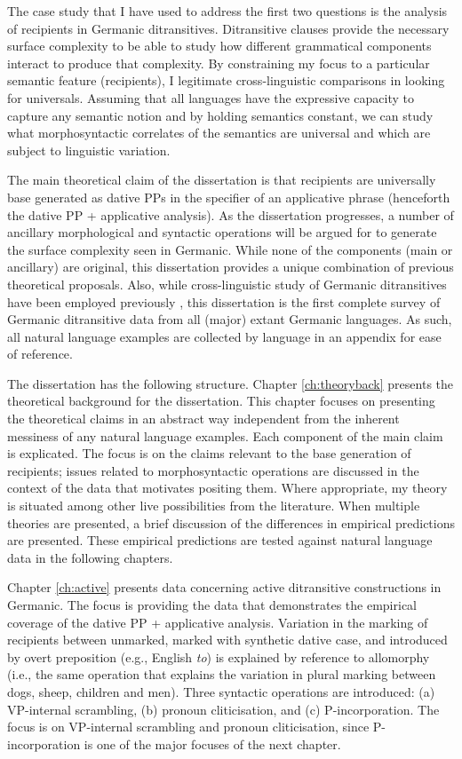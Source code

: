 The case study that I have used to address the first two questions is the analysis of recipients in Germanic ditransitives. Ditransitive clauses provide the necessary surface complexity to be able to study how different grammatical components interact to produce that complexity. By constraining my focus to a particular semantic feature (recipients), I legitimate cross-linguistic comparisons in looking for universals. Assuming that all languages have the expressive capacity to capture any semantic notion and by  holding semantics constant, we can study  what morphosyntactic correlates of the semantics are universal and which are subject to linguistic variation.

The main theoretical claim of the dissertation is that recipients are universally base generated as dative PPs in the specifier of an applicative phrase (henceforth the dative PP + applicative analysis). As the dissertation progresses, a number of ancillary morphological and syntactic operations will be argued for to generate the surface complexity seen in Germanic. While none of the components (main or ancillary) are original, this dissertation provides a unique combination of previous theoretical proposals. Also, while cross-linguistic study of Germanic ditransitives have been employed previously \citep[among others]{Falk.1990,Sprouse.1995,Holmberg.1995}, this dissertation is the first complete survey of Germanic ditransitive data from all (major) extant Germanic languages. As such, all natural language examples are collected by language in an appendix for ease of reference.

The dissertation has the following structure. Chapter \ref{ch:theoryback} presents the theoretical background for the dissertation. This chapter focuses on presenting the theoretical claims in an abstract way independent from the inherent messiness of any natural language examples. Each component of the main claim is explicated. The focus is on the claims relevant to the base generation of recipients; issues related to morphosyntactic operations are discussed in the context of the data that motivates positing them. Where appropriate, my theory is situated among other live possibilities from the literature. When multiple theories are presented, a brief discussion of the differences in empirical predictions are presented. These empirical predictions are tested against natural language data in the following chapters.

Chapter \ref{ch:active} presents data concerning active ditransitive constructions in Germanic. The focus is providing the data that demonstrates the empirical coverage of the dative PP + applicative analysis. Variation in the marking of recipients between unmarked, marked with synthetic dative case, and introduced by overt preposition (e.g., English \textit{to}) is explained by reference to allomorphy (i.e., the same operation that explains the variation in plural marking between dogs, sheep, children and men). Three syntactic operations are introduced: (a) VP-internal scrambling, (b) pronoun cliticisation, and (c) P-incorporation. The focus is on VP-internal scrambling and pronoun cliticisation, since P-incorporation is one of the major focuses of the next chapter.

